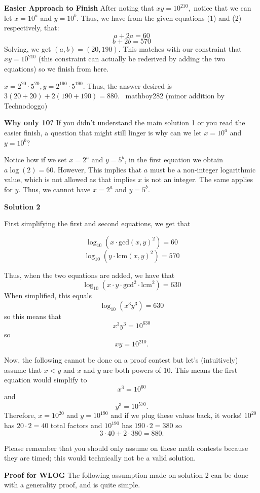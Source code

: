 \begin{enumerate}
 \textbf{Easier Approach to Finish} After noting that $xy=10^{210},$ notice that we can let $x=10^a$ and $y=10^b.$ Thus, we have from the given equations (1) and (2) respectively, that:
 \[a+2a=60\]
 \[b+2b=570\]Solving, we get $(a,b)=(20,190).$ This matches with our constraint that $xy=10^{210}$ (this constraint can actually be rederived by adding the two equations) so we finish from here.

 $x=2^{20}\cdot 5^{20}, y=2^{190}\cdot 5^{190}.$ Thus, the answer desired is $3(20+20)+2(190+190)=880.$ ~mathboy282 (minor addition by Technodoggo)

 \textbf{Why only 10?} If you didn't understand the main solution 1 or you read the easier finish, a question that might still linger is why can we let  $x=10^a$ and $y=10^b$?

 Notice how if we set $x = 2^a$ and $y = 5^b$, in the first equation we obtain$a\log(2) =60$. However, This implies that $a$ must be a non-integer logarithmic value, which is not allowed as that implies $x$ is not an integer. The same applies for $y$. Thus, we cannot have $x = 2^a$ and $y = 5^b$.

 



\textbf{Solution 2}

First simplifying the first and second equations, we get that 

 
 \[\log_{10}(x\cdot\text{gcd}(x,y)^2)=60\]
 \[\log_{10}(y\cdot\text{lcm}(x,y)^2)=570\]

 
Thus, when the two equations are added, we have that
 \[\log_{10}(x\cdot y\cdot\text{gcd}^2\cdot\text{lcm}^2)=630\]When simplified, this equals 
 \[\log_{10}(x^3y^3)=630\]so this means that
 \[x^3y^3=10^{630}\]so
 \[xy=10^{210}.\]

 Now, the following cannot be done on a proof contest but let's (intuitively) assume that $x<y$ and $x$ and $y$ are both powers of $10$. This means the first equation would simplify to 
 \[x^3=10^{60}\] and 
 \[y^3=10^{570}.\] Therefore, $x=10^{20}$ and $y=10^{190}$ and if we plug these values back, it works! $10^{20}$ has $20\cdot2=40$ total factors and $10^{190}$ has $190\cdot2=380$ so 
 \[3\cdot 40 + 2\cdot 380 = \boxed{880}.\]

 Please remember that you should only assume on these math contests because they are timed; this would technically not be a valid solution.

 \textbf{Proof for WLOG} The following assumption made on solution 2 can be done with a generality proof, and is quite simple.


\end{enumerate}
